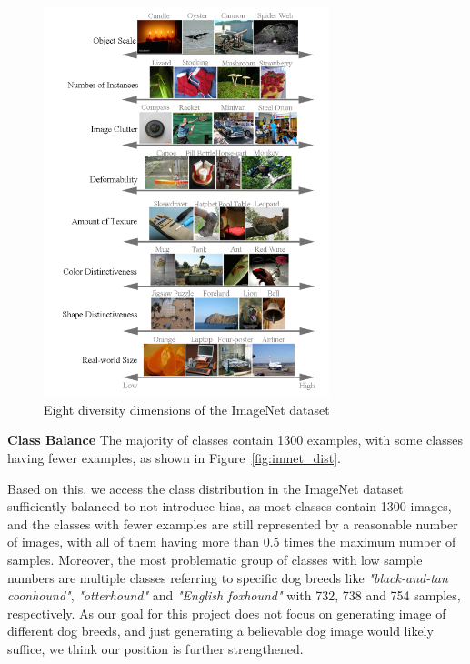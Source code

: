 \begin{figure}[ht]
    \centering
    \includegraphics[width=0.74\textwidth]{../../sample_images/imnet_dimension}
    \caption{Eight diversity dimensions of the ImageNet dataset~\cite{imagenet_breakdown}}
    \label{fig:imnet_dimensions}
\end{figure}

\textbf{Class Balance}
The majority of classes contain 1300 examples, with some classes having fewer examples, as shown in
Figure~\ref{fig:imnet_dist}.

Based on this, we access the class distribution in the ImageNet dataset sufficiently balanced to not introduce bias, as
most classes contain 1300 images, and the classes with fewer examples are still represented by a reasonable number
of images, with all of them having more than 0.5 times the maximum number of samples.
Moreover, the most problematic group of classes with low sample numbers are multiple classes referring to specific dog breeds
like \textit{"black-and-tan coonhound"}, \textit{"otterhound"} and \textit{"English foxhound"} with 732,
738 and 754 samples, respectively.
As our goal for this project does not focus on generating image of different dog breeds, and just generating a
believable dog image would likely suffice, we think our position is further strengthened.

